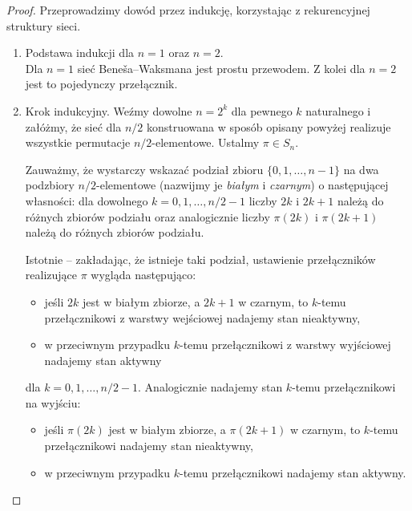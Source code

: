 \documentclass[a4paper]{article}
\theoremstyle{definition}
\begin{document}
\begin{proof}
Przeprowadzimy dowód przez indukcję, korzystając z rekurencyjnej struktury sieci. 

    \begin{enumerate} 
        \item Podstawa indukcji dla $n = 1$ oraz $n = 2$. \\
        Dla $n = 1$ sieć Beneša--Waksmana jest prostu przewodem. Z kolei dla $n = 2$ jest to pojedynczy przełącznik.

        \item Krok indukcyjny. Weźmy dowolne $n = 2^k$ dla pewnego $k$ naturalnego i załóżmy, że sieć dla \(n/2\) konstruowana w sposób opisany powyżej realizuje wszystkie permutacje $n/2$-elementowe. 
        Ustalmy \(\pi \in S_n\).
        
        Zauważmy, że wystarczy wskazać podział zbioru \(\{0, 1, \ldots, n-1\}\) na dwa podzbiory \(n/2\)-elementowe (nazwijmy je \emph{białym} i \emph{czarnym}) o następującej własności: dla dowolnego \(k = 0, 1, \ldots, n/2 - 1\) liczby \(2k\) i \(2k+1\) należą do różnych zbiorów podziału oraz analogicznie liczby \(\pi(2k)\) i \(\pi(2k+1)\) należą do różnych zbiorów podziału.

        \vspace{.5em}

        Istotnie -- zakładając, że istnieje taki podział, ustawienie przełączników realizujące \(\pi\) wygląda następująco: 

        \begin{itemize}
            \item jeśli \(2k\) jest w białym zbiorze, a \(2k+1\) w czarnym, to \(k\)-temu przełącznikowi z warstwy wejściowej nadajemy stan nieaktywny,
            \item w przeciwnym przypadku \(k\)-temu przełącznikowi z warstwy wyjściowej nadajemy stan aktywny
        \end{itemize}
        dla \(k = 0, 1, \ldots, n/2-1\). Analogicznie nadajemy stan \(k\)-temu przełącznikowi na wyjściu:
        \begin{itemize}
            \item jeśli \(\pi(2k)\) jest w białym zbiorze, a \(\pi(2k+1)\) w czarnym, to \(k\)-temu przełącznikowi nadajemy stan nieaktywny,
            \item w przeciwnym przypadku \(k\)-temu przełącznikowi nadajemy stan aktywny.  
        \end{itemize}


\end{enumerate}
\end{proof}
\end{document}
